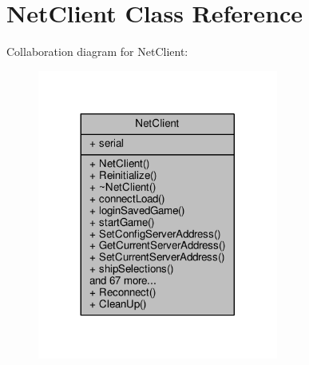 \hypertarget{classNetClient}{}\section{Net\+Client Class Reference}
\label{classNetClient}


Collaboration diagram for Net\+Client\+:
\nopagebreak
\begin{figure}[H]
\begin{center}
\leavevmode
\includegraphics[width=224pt]{d2/d1e/classNetClient__coll__graph}
\end{center}
\end{figure}
